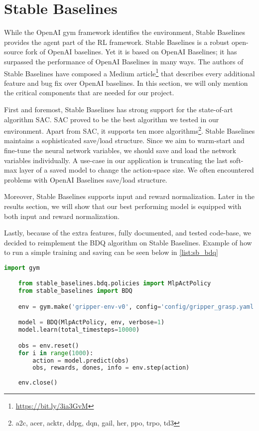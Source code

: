 \section{Stable Baselines}


While the OpenAI gym framework identifies the environment, Stable Baselines provides the agent part of the RL framework. Stable Baselines is a robust open-source fork of OpenAI baselines. Yet it is based on OpenAI Baselines; it has surpassed the performance of OpenAI Baselines in many ways. 
The authors of Stable Baselines have composed a Medium article\footnote{\url{https://bit.ly/3ia3GvM}} that describes every additional feature and bug fix over OpenAI baselines. In this section, we will only mention the critical components that are needed for our project.

First and foremost, Stable Baselines has strong support for the state-of-art algorithm SAC. SAC proved to be the best algorithm we tested in our environment. Apart from SAC, it supports ten more algorithms\footnote{a2c, 
acer, acktr, ddpg, dqn, gail, her, ppo, trpo, td3}. Stable Baselines maintains a sophisticated save/load structure. Since we aim to warm-start and fine-tune the neural network variables, we should save and load the network variables individually. A use-case in our application is truncating the last soft-max layer of a saved model to change the action-space size. We often encountered problems with OpenAI Baselines save/load structure.

Moreover, Stable Baselines supports input and reward normalization. Later in the results section, we will show that our best performing model is equipped with both input and reward normalization.

Lastly, because of the extra features, fully documented, and tested code-base, we decided to reimplement the BDQ algorithm on Stable Baselines. Example of how to run a simple training and saving can be seen below in \ref{list:sb_bdq}


\begin{lstlisting}[language=Python, caption=Example of training and saving BDQ algorithm on gripper-env, label=list:sb_bdq]
    import gym

    from stable_baselines.bdq.policies import MlpActPolicy
    from stable_baselines import BDQ

    env = gym.make('gripper-env-v0', config='config/gripper_grasp.yaml')

    model = BDQ(MlpActPolicy, env, verbose=1)
    model.learn(total_timesteps=10000)

    obs = env.reset()
    for i in range(1000):
        action = model.predict(obs)
        obs, rewards, dones, info = env.step(action)
    
    env.close()
\end{lstlisting}